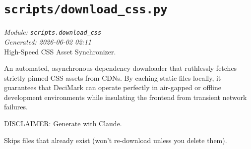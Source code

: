 
\section{\texttt{scripts/download\_css.py}}
\textit{Module: \texttt{scripts.download\_css}} \\
\textit{Generated: 2026-06-02 02:11} \\

High-Speed CSS Asset Synchronizer.

An automated, asynchronous dependency downloader that ruthlessly fetches
strictly pinned CSS assets from CDNs. By caching static files locally,
it guarantees that DeciMark can operate perfectly in air-gapped or
offline development environments while insulating the frontend from
transient network failures.

DISCLAIMER: Generate with Claude.

Skips files that already exist (won't re-download unless you delete
them).
